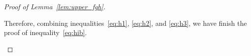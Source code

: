 \documentclass[lettersize,onecolumn,journal]{IEEEtran}
\theoremstyle{definition}
\theoremstyle{definition}
\begin{document}
\begin{proof}[Proof of Lemma~\ref{lem:upper_fgh}]
\begin{enumerate}
    Therefore, combining inequalities~\eqref{eq:h1}, \eqref{eq:h2}, and \eqref{eq:h3}, we have finish the proof of inequality~\eqref{eq:hib}.

\end{enumerate}


\end{proof}
\end{document}
